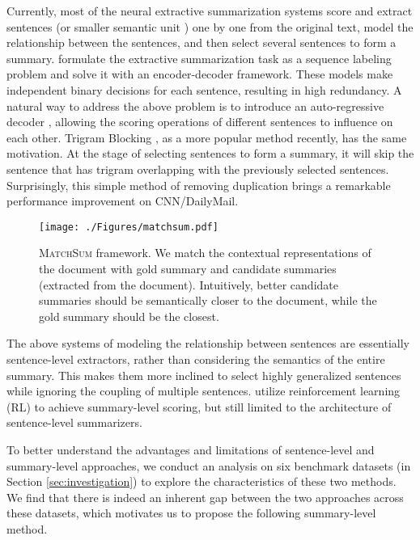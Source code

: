 Currently, most of the neural extractive summarization systems score and extract sentences (or smaller semantic unit \cite{xu2019discourse}) one by one from the original text, model the relationship between the sentences, and then select several sentences to form a summary. \citet{cheng2016neural, nallapati2017summarunner} formulate the extractive summarization task as a sequence labeling problem and solve it with an encoder-decoder framework. These models make independent binary decisions for each sentence, resulting in high redundancy. A natural way to address the above problem is to introduce an auto-regressive decoder \cite{chen2018fast, jadhav2018extractive, zhou2018neural}, allowing the scoring operations of different sentences to influence on each other. Trigram Blocking \cite{paulus2017deep,liu2019text}, as a more popular method recently, has the same motivation. At the stage of selecting sentences to form a summary, it will skip the sentence that has trigram overlapping with the previously selected sentences. Surprisingly, this simple method of removing duplication brings a remarkable performance improvement on CNN/DailyMail.

\begin{figure}
    \centering
    \texttt{[image: ./Figures/matchsum.pdf]}
    \caption{\textsc{MatchSum} framework. We match the contextual representations of the document with gold summary and candidate summaries (extracted from the document). Intuitively, better candidate summaries should be semantically closer to the document, while the gold summary should be the closest.}
    \label{fig:framework}
\end{figure}

The above systems of modeling the relationship between sentences are essentially sentence-level extractors, rather than considering the semantics of the entire summary. This makes them more inclined to select highly generalized sentences while ignoring the coupling of multiple sentences. \citet{narayan2018ranking,bae2019summary} utilize reinforcement learning (RL) to achieve summary-level scoring, but still limited to the architecture of sentence-level summarizers.

To better understand the advantages and limitations of sentence-level and summary-level approaches, we conduct an analysis on six benchmark datasets (in Section \ref{sec:investigation}) to explore the characteristics of these two methods. We find that there is indeed an inherent gap between the two approaches across these datasets, which motivates us to propose the following summary-level method.

